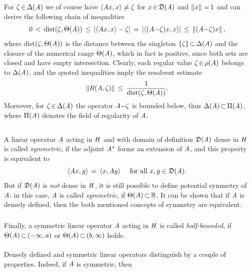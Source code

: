 \documentclass[11pt,twoside]{article}
\begin{document}
\subparagraph{} %
For $\zeta {\,\in\,} \Delta(\mathit{A})$ we of course have
$\langle \mathit{A} x,x \rangle \neq \zeta$
for $x {\,\in\,} \mathfrak{D}(\mathit{A})$ and $\left\lVert x \right\rVert {\,=\,} 1$
and can derive the following chain of inequalities
\[
0 \, < \, \mbox{dist}(\zeta,\Theta(\linA)) \, \leq \,
\abs{\scalar{\linA x}{x} - \zeta} \=
\abs{\scalar{(\linA {-} \zeta)x}{x}} \, \leq \,
\norm{(\linA {-}\zeta) x},
\]
where dist$(\zeta,\Theta(\mathit{A}))$ is the distance
between the singleton $\{\zeta\} {\,\subset\,} \Delta(\mathit{A})$
and the closure of the numerical range $\Theta(\mathit{A})$,
which in fact is positive,
since both sets are closed and have empty intersection.
Clearly,
each regular value $\zeta {\,\in\,} \rho(\mathit{A})$ belongs to $\Delta(\mathit{A})$,
and the quoted inequalities imply the resolvent estimate
\[
\left\lVert R(\mathit{A},\zeta) \right\rVert \, \leq \, \frac{1}{\mbox{dist}(\zeta,\Theta(\mathit{A}))}.
\]
Moreover,
for $\zeta {\,\in\,} \Delta(\mathit{A})$
the operator $\mathit{A} {-} \zeta$ is bounded below,
thus
$\Delta(\mathit{A}) {\,\subset\,} \Pi(\mathit{A})$,
where $\Pi(\mathit{A})$ denotes the {field of regularity} of $\mathit{A}$.

\subsection{} %
A linear operator $\mathit{A}$ acting in $\mathit{H}$
and with domain of definition $\mathfrak{D}(\mathit{A})$ dense in $\mathit{H}$ 
is called \textit{symmetric},
if the adjoint $\mathit{A}^*$ forms an extension of $\mathit{A}$,
and this property is equivalent to
\[
\langle \mathit{A} x,y \rangle \,=\, \langle x,\mathit{A} y \rangle \quad \mbox{ for all } x,y \in \mathfrak{D}(\mathit{A}).
\]
But if $\mathfrak{D}(\mathit{A})$ is \textit{not} dense in $\mathit{H}$,
it is still possible to define potential symmetry of $\mathit{A}$:
in this case, $\mathit{A}$ is called \textit{symmetric},
if $\Theta(\mathit{A}) {\,\subset\,} {\mathbb{R}}$.
It can be shown
that if $\mathit{A}$ is densely defined,
then the both mentioned concepts of symmetry are equivalent. 

\subparagraph{} %
Finally,
a symmetric linear operator $\mathit{A}$ acting in $\mathit{H}$
is called \textit{half-bounded},
if $\Theta(\mathit{A}) {\,\subset\,} ({-}\infty,a)$
or $\Theta(\mathit{A}) {\,\subset\,} (b,\infty)$ holds.

\paragraph{} %
Densely defined and symmetric linear operators distinguish
by a couple of properties.
Indeed, if $\mathit{A}$ is symmetric, then
\end{document}
